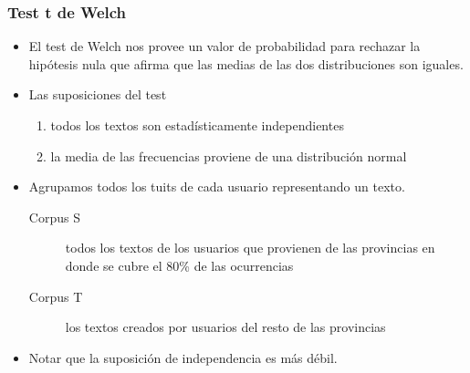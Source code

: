 \begin{frame}[t]\frametitle{Test t de Welch}

    \begin{itemize}
        \item El test de Welch nos provee un valor de probabilidad para rechazar la hipótesis nula que afirma que las medias de las dos distribuciones son iguales.

        \item Las suposiciones del test 
        \begin{enumerate}
            \item todos los textos son estadísticamente independientes 
            \item la media de las frecuencias proviene de una distribución normal
        \end{enumerate}
        \item Agrupamos todos los tuits de cada usuario representando un texto.
        \begin{description}
            \item[Corpus S] todos los textos de los usuarios que provienen de las provincias en donde se cubre el 80\% de las ocurrencias
            \item[Corpus T] los textos creados por usuarios del resto de las provincias
        \end{description}
        \item Notar que la suposición de independencia es más débil.

    \end{itemize}

\end{frame}


